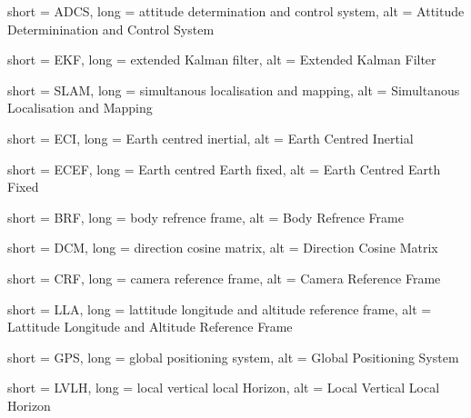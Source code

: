 {
	short = ADCS,
	long = attitude determination and control system,
	alt = Attitude Determinination and Control System
}

{
	short = EKF,
	long = extended Kalman filter,
	alt = Extended Kalman Filter
}

{
	short = SLAM,
	long = simultanous localisation and mapping,
	alt = Simultanous Localisation and Mapping
}

{
	short = ECI,
	long = Earth centred inertial,
	alt = Earth Centred Inertial
}

{
	short = ECEF,
	long = Earth centred Earth fixed,
	alt = Earth Centred Earth Fixed
}

{
	short = BRF,
	long = body refrence frame,
	alt = Body Refrence Frame
}

{
	short = DCM,
	long = direction cosine matrix,
	alt = Direction Cosine Matrix
}

{
	short = CRF,
	long = camera reference frame,
	alt = Camera Reference Frame
}

{
	short = LLA,
	long = lattitude longitude and altitude reference frame,
	alt = Lattitude Longitude and Altitude Reference Frame
}

{
	short = GPS,
	long = global positioning system,
	alt = Global Positioning System
}

{
	short = LVLH,
	long = local vertical local Horizon,
	alt = Local Vertical Local Horizon
}